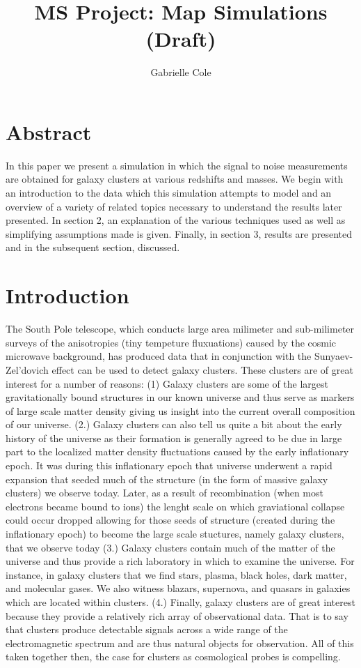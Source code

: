 \documentclass[12pt]{article} %
\title{MS Project: Map Simulations (Draft)}
\author{Gabrielle Cole}
\date{} %
\begin{document}
\maketitle
\tableofcontents

\section{Abstract}

In this paper we present a simulation in which the signal to noise measurements are obtained for galaxy clusters at various redshifts and masses. We begin with an introduction to the data which this simulation attempts to model and an overview of a variety of related topics necessary to understand the results later presented. In section 2, an explanation of the various techniques used as well as simplifying assumptions made is given. Finally, in section 3, results are presented and in the subsequent section, discussed. 
 

\section{Introduction}

The South Pole telescope, which conducts large area milimeter and sub-milimeter surveys of the anisotropies (tiny tempeture fluxuations) caused by the cosmic microwave background, has produced data that in conjunction with the Sunyaev-Zel'dovich effect can be used to detect galaxy clusters. These clusters are of great interest for a number of reasons: (1) Galaxy clusters are some of the largest gravitationally bound structures in our known universe and thus serve as markers of large scale matter density giving us insight into the current overall composition of our universe. (2.) Galaxy clusters can also tell us quite a bit about the early history of the universe as their formation is generally agreed to be due in large part to the localized matter density fluctuations caused by the early inflationary epoch. It was during this inflationary epoch that universe underwent a rapid expansion that seeded much of the structure (in the form of massive galaxy clusters) we observe today. Later, as a result of recombination (when most electrons became bound to ions) the lenght scale on which graviational collapse could occur dropped allowing for those seeds of structure (created during the inflationary epoch) to become the large scale stuctures, namely galaxy clusters, that we observe today (3.) Galaxy clusters contain much of the matter of the universe and thus provide a rich laboratory in which to examine the universe. For instance, in galaxy clusters that we find stars, plasma, black holes, dark matter, and molecular gases. We also witness blazars, supernova, and quasars in galaxies which are located within clusters. (4.) Finally, galaxy clusters are of great interest because they provide a relatively rich array of observational data. That is to say that clusters produce detectable signals across a wide range of the electromagnetic spectrum and are thus natural objects for observation. All of this taken together then, the case for clusters as cosmological probes is compelling. 
\end{document}
